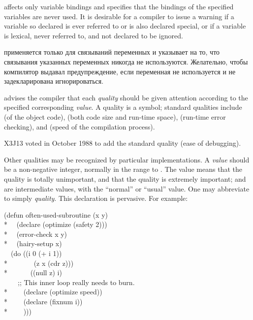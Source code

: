 \begin{flushdesc}
\item[\cdf{ignore}]
 affects only variable bindings
and specifies that the bindings
of the specified variables are never used. It is desirable for a compiler
to issue a warning if a variable so declared is ever referred to
or is also declared special, or if a variable is lexical, never referred to,
and not declared to be ignored.

\item[\cdf{ignore}]
 применяется только для
связываний переменных и указывает на то, что связывания указанных переменных
никогда не используются. Желательно, чтобы компилятор выдавал предупреждение, если
переменная не используется и не задекларирована игнорироваться.

\item[\cdf{optimize}]
advises the compiler that each \emph{quality} should be given attention
according to the specified corresponding \emph{value}.
A quality is a symbol; standard qualities
include  (of the object code),  (both code size and
run-time space),  (run-time error checking),
and  (speed of the compilation process).
\begin{newer}
X3J13 voted in October 1988  to add
the standard quality  (ease of debugging).
\end{newer}
Other qualities may be recognized by particular implementations.
A \emph{value} should be a non-negative integer, normally in the range
 to .  The value  means that the quality is totally
unimportant, and  that the quality is extremely important;
 and  are intermediate values, with  the ``normal''
or ``usual'' value.
One may abbreviate  to simply \emph{quality}.
This declaration is pervasive.
For example:
\begin{lisp}
(defun often-used-subroutine (x y) \\*
~~(declare (optimize (safety 2))) \\*
~~(error-check x y) \\*
~~(hairy-setup x) \\
~~(do ((i 0 (+ i 1)) \\*
~~~~~~~(z x (cdr z))) \\*
~~~~~~((null z) i) \\
~~~~;; This inner loop really needs to burn. \\*
~~~~(declare (optimize speed)) \\*
~~~~(declare (fixnum i)) \\*
~~~~)))
\end{lisp}


\end{flushdesc}
